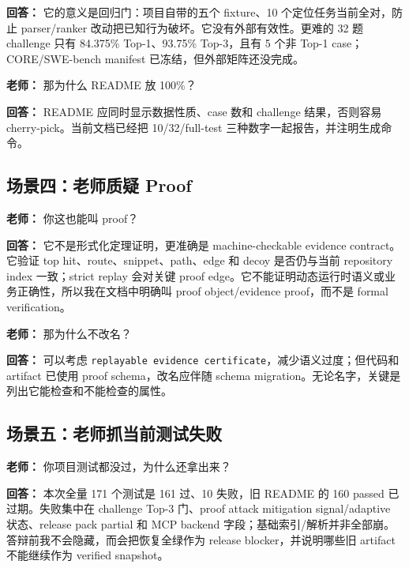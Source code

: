 \documentclass[UTF8,12pt,openany]{ctexbook}
\begin{document}
\textbf{回答：} 它的意义是回归门：项目自带的五个 fixture、10 个定位任务当前全对，防止 parser/ranker 改动把已知行为破坏。它没有外部有效性。更难的 32 题 challenge 只有 84.375\% Top-1、93.75\% Top-3，且有 5 个非 Top-1 case；CORE/SWE-bench manifest 已冻结，但外部矩阵还没完成。\par

\textbf{老师：} 那为什么 README 放 100\%？\par

\textbf{回答：} README 应同时显示数据性质、case 数和 challenge 结果，否则容易 cherry-pick。当前文档已经把 10/32/full-test 三种数字一起报告，并注明生成命令。\par

\subsection{场景四：老师质疑 Proof}

\textbf{老师：} 你这也能叫 proof？\par

\textbf{回答：} 它不是形式化定理证明，更准确是 machine-checkable evidence contract。它验证 top hit、route、snippet、path、edge 和 decoy 是否仍与当前 repository index 一致；strict replay 会对关键 proof edge。它不能证明动态运行时语义或业务正确性，所以我在文档中明确叫 proof object/evidence proof，而不是 formal verification。\par

\textbf{老师：} 那为什么不改名？\par

\textbf{回答：} 可以考虑 \texttt{replayable evidence certificate}，减少语义过度；但代码和 artifact 已使用 proof schema，改名应伴随 schema migration。无论名字，关键是列出它能检查和不能检查的属性。\par

\subsection{场景五：老师抓当前测试失败}

\textbf{老师：} 你项目测试都没过，为什么还拿出来？\par

\textbf{回答：} 本次全量 171 个测试是 161 过、10 失败，旧 README 的 160 passed 已过期。失败集中在 challenge Top-3 门、proof attack mitigation signal/adaptive 状态、release pack partial 和 MCP backend 字段；基础索引/解析并非全部崩。答辩前我不会隐藏，而会把恢复全绿作为 release blocker，并说明哪些旧 artifact 不能继续作为 verified snapshot。\par
\end{document}
